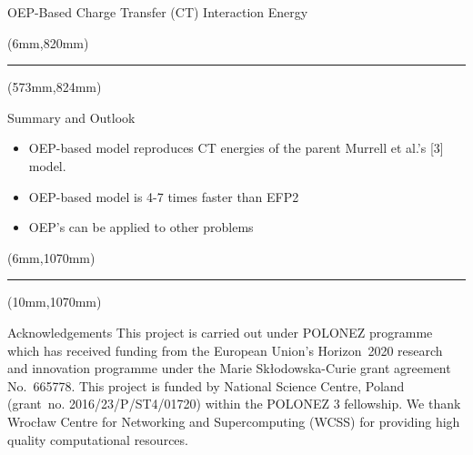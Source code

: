 \documentclass[final]{beamer} %
\begin{document}
\begin{frame}{OEP-Based Charge Transfer (CT) Interaction Energy}
\begin{textblock*}{820mm}(6mm,820mm)
\noindent\rule{83cm}{5.4pt}
\end{textblock*}

\begin{textblock*}{257mm}(573mm,824mm)
\begin{block}{Summary and Outlook}
 \begin{itemize}
   \item OEP-based model reproduces CT energies of the parent Murrell et al.'s [3] model.
   \item OEP-based model is 4-7 times faster than EFP2
   \item OEP's can be applied to other problems
 \end{itemize}
\end{block}
\end{textblock*}



\begin{textblock*}{820mm}(6mm,1070mm)
\noindent\rule{83cm}{5.4pt}
\end{textblock*}


%
%
%
\begin{textblock*}{820mm}(10mm,1070mm)
\begin{block}{Acknowledgements}
 This project is carried out under POLONEZ programme which has received funding from the European Union's
 Horizon~2020 research and innovation programme under the Marie Sk{\l}odowska-Curie grant agreement 
 No.~665778. This project is funded by National Science Centre, Poland 
 (grant~no. 2016/23/P/ST4/01720) within the POLONEZ 3 fellowship.
 We thank
 Wroc{\l}aw Centre for Networking and Supercomputing (WCSS) for
 providing high quality computational resources.
\end{block}
\end{textblock*}
%
%
%
%
%
\end{frame}
\end{document}
